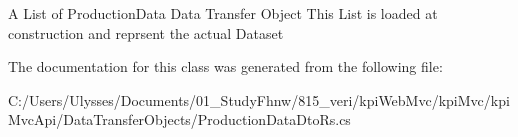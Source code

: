 A List of Production\+Data Data Transfer Object This List is loaded at construction and reprsent the actual Dataset 



The documentation for this class was generated from the following file\+:\begin{DoxyCompactItemize}
\item 
C\+:/\+Users/\+Ulysses/\+Documents/01\+\_\+\+Study\+Fhnw/815\+\_\+veri/kpi\+Web\+Mvc/kpi\+Mvc/kpi\+Mvc\+Api/\+Data\+Transfer\+Objects/Production\+Data\+Dto\+Rs.\+cs\end{DoxyCompactItemize}
